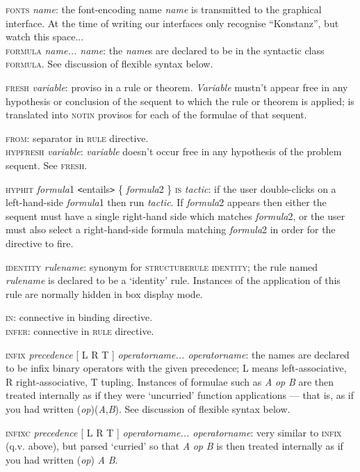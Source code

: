 \textsc{fonts} \textit{name}: the font-encoding name \textit{name} is transmitted to the graphical interface. At the time of writing our interfaces only recognise ``Konstanz'', but watch this space...\\
\textsc{formula} \textit{name... name}: the \textit{name}s are declared to be in the syntactic class \textsc{formula}. See discussion of flexible syntax below.


\textsc{fresh} \textit{variable}: proviso in a rule or theorem. \textit{Variable} mustn't appear free in any hypothesis or conclusion of the sequent to which the rule or theorem is applied; is translated into \textsc{notin} provisos for each of the formulae of that sequent.


\textsc{from}: separator in \textsc{rule} directive.\\
\textsc{hypfresh} \textit{variable}: \textit{variable} doesn't occur free in any hypothesis of the problem sequent. See \textsc{fresh.}


\textsc{hyphit} \textit{formula}1 \texttt{<}entails\texttt{>} \{ \textit{formula}2 \} \textsc{is} \textit{tactic}: if the user double-clicks on a left-hand-side \textit{formula}1 then run \textit{tactic}. If \textit{formula}2 appears then either the sequent must have a single right-hand side which matches \textit{formula}2, or the user must also select a right-hand-side formula matching \textit{formula}2 in order for the directive to fire.


\textsc{identity} \textit{rulename}: synonym for \textsc{structurerule} \textsc{identity}; the rule named \textit{rulename} is declared to be a `identity' rule. Instances of the application of this rule are normally hidden in box display mode.


\textsc{in}: connective in binding directive.\\
\textsc{infer}: connective in \textsc{rule} directive.


\textsc{infix} \textit{precedence} [ L {\textbar} R {\textbar} T ] \textit{operatorname... operatorname}: the names are declared to be infix binary operators with the given precedence; L means left-associative, R right-associative, T tupling. Instances of formulae such as \textit{A} \textit{op} \textit{B} are then treated internally as if they were `uncurried' function applications --- that is, as if you had written (\textit{op})(\textit{A},\textit{B}). See discussion of flexible syntax below.


\textsc{infixc} \textit{precedence} [ L {\textbar} R {\textbar} T ] \textit{operatorname... operatorname}: very similar to \textsc{infix} (q.v. above), but parsed `curried' so that \textit{A} \textit{op} \textit{B} is then treated internally as if you had written (\textit{op}) \textit{A} \textit{B}.


